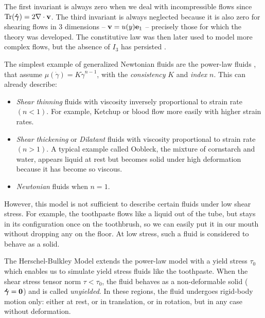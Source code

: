\documentclass[11 pt]{report}
\begin{document}
The first invariant is always zero when we deal with incompressible flows since $\Tr(\boldsymbol{\dot \gamma}) = 2 \nabla \cdot \mathbf{v}$. The third invariant is always neglected because it is also zero for shearing flows in 3 dimensions -- $\mathbf{v} = u(y)\mathbf{e}_1$ -- precisely those for which the theory was developed. The constitutive law was then later used to model more complex flows, but the absence of $I_3$ has persisted \cite{bird1987dynamics}.

The simplest example of generalized Newtonian fluids are the power-law fluids \cite{bird1987dynamics,Geophysical}, that assume $\mu(\dot\gamma) = K \dot \gamma^{n-1}$, with the \textit{consistency} $K$ and \textit{index} $n$. This can already describe:
\begin{itemize}[label=---, topsep=0pt]
    \setlength{\itemsep}{0pt}
    \item\textit{Shear thinning} fluids with viscosity inversely proportional to strain rate $(n<1)$. For example, Ketchup or blood flow more easily with higher strain rates.
    \item\textit{Shear thickening} or \textit{Dilatant} fluids with viscosity proportional to strain rate $(n>1)$. A typical example called Oobleck, the mixture of cornstarch and water, appears liquid at rest but becomes solid under high deformation because it has become so viscous.
    \item \textit{Newtonian} fluids when $n=1$.
\end{itemize}

However, this model is not sufficient to describe certain fluids under low shear stress. For example, the toothpaste flows like a liquid out of the tube, but stays in its configuration once on the toothbrush, so we can easily put it in our mouth without dropping any on the floor. At low stress, such a fluid is considered to behave as a solid.

The Herschel-Bulkley Model \cite{bird1987dynamics,Geophysical,Coussot} extends the power-law model with a yield stress $\tau_0$ which enables us to simulate yield stress fluids like the toothpaste. When the shear stress tensor norm $\tau < \tau_0$, the fluid behaves as a non-deformable solid ($\boldsymbol{\dot \gamma}=\mathbf{0}$) and is called \textit{unyielded}. In these regions, the fluid undergoes rigid-body motion only: either at rest, or in translation, or in rotation, but in any case without deformation.
\end{document}
